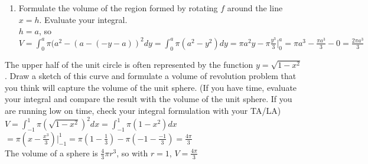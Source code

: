\documentclass{ximera}
\begin{document}
\begin{exercise}
\begin{enumerate}
{        This is the same area as (a).\\
        For $g$: $y=\frac{1}{a}(x-a)^2$ so $x=a-\sqrt{ay}$\\
        $V=\displaystyle\int_0^a \pi(a-\sqrt{ay})^2dy$\\
        $=\displaystyle \pi\int_0^a (a^2-2a\sqrt{ay}+ay)dy$\\
        $=\displaystyle (a^2y-\frac{4}{3}(ay)^{\frac{3}{2}}+\frac{ay^2}{2})\bigg|_0^a=a^3-\frac{4}{3}a^3+\frac{a^3}{2}-0=\frac{\pi a^3}{6}$\\
        Different area from (b).}
        \item Formulate the volume of the region formed by rotating $f$ around the line $x=h$.  Evaluate your integral.  \\
        {\color{blue} $h=a$, so $V=\displaystyle\int_0^a \pi(a^2-(a-(-y-a))^2dy=\int_0^a \pi(a^2-y^2)dy=\pi a^2y-\pi\frac{y^3}{3}\bigg|_0^a=\pi a^3-\frac{\pi a^3}{3}-0=\frac{2\pi a^3}{3}$}

    \end{enumerate}
\end{exercise}

\begin{exercise}
    The upper half of the unit circle is often represented by the function $y = \sqrt{1-x^2}$. Draw a sketch of this curve and formulate a volume of revolution problem that you think will capture the volume of the unit sphere. (If you have time, evaluate your integral and compare the result with the volume of the unit sphere. If you are running low on time, check your integral formulation with your TA/LA)\\
    {\color{blue} $V=\displaystyle \int_{-1}^1\pi(\sqrt{1-x^2})^2dx=\int_{-1}^1\pi(1-x^2)dx$\\
    $=\pi(x-\frac{x^3}{3})\bigg|_{-1}^1=\pi(1-\frac{1}{3})-\pi(-1-\frac{-1}{3})=\frac{4\pi}{3}$\\
    The volume of a sphere is $\frac{4}{3}\pi r^3$, so with $r=1$, $V=\frac{4\pi}{3}$}
\end{exercise}
\end{document}
